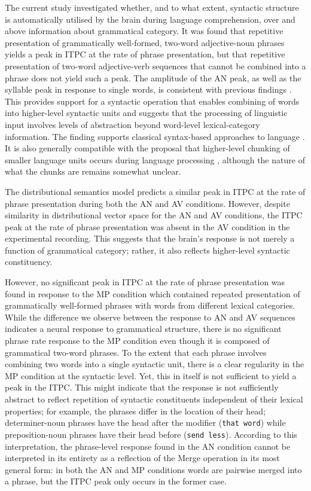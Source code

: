 \documentclass[10pt,letterpaper]{article}
\newcommand{\citet}[1]{\cite{#1}}
\begin{document}
The current study investigated whether, and to what extent, syntactic
structure is automatically utilised by the brain during language
comprehension, over and above information about grammatical
category. It was found that repetitive presentation of grammatically
well-formed, two-word adjective-noun phrases yields a peak in ITPC at
the rate of phrase presentation, but that repetitive presentation of
two-word adjective-verb sequences that cannot be combined into a
phrase does not yield such a peak. The amplitude of the AN peak, as well
as the syllable peak in response to single words, is consistent with
previous findings \citet{DingEtAl2017}. This provides support for a
syntactic operation that enables combining of words into higher-level
syntactic units and suggests that the processing of linguistic input
involves levels of abstraction beyond word-level lexical-category
information. The finding supports classical syntax-based approaches to
language \citet{BerwickEtAl2013,EveraertEtAl2015,Chomsky1995}. It is
also generally compatible with the proposal that higher-level chunking
of smaller language units occurs during language processing
\citet{ChristiansenChater2016}, although the nature of what the chunks
are remains somewhat unclear.

The distributional semantics model predicts a similar peak in ITPC at
the rate of phrase presentation during both the AN and AV
conditions. However, despite similarity in distributional vector space
for the AN and AV conditions, the ITPC peak at the rate of phrase
presentation was absent in the AV condition in the experimental
recording. This suggests that the brain's response is not merely a
function of grammatical category; rather, it also reflects
higher-level syntactic constituency.

However, no significant peak in ITPC at the rate of phrase
presentation was found in response to the MP condition which contained
repeated presentation of grammatically well-formed phrases with words
from different lexical categories. While the difference we observe
between the response to AN and AV sequences indicates a neural
response to grammatical structure, there is no significant phrase rate
response to the MP condition even though it is composed of grammatical
two-word phrases. To the extent that each phrase involves combining
two words into a single syntactic unit, there is a clear regularity in
the MP condition at the syntactic level. Yet, this in itself is not
sufficient to yield a peak in the ITPC. This might indicate that the
response is not sufficiently abstract to reflect repetition of
syntactic constituents independent of their lexical properties; for
example, the phrases differ in the location of their head;
determiner-noun phrases have the head after the modifier (\texttt{that
word}) while preposition-noun phrases have their head before (\texttt{send
less}). According to this interpretation, the phrase-level response
found in the AN condition cannot be interpreted in its entirety as a
reflection of the Merge operation \citet{Chomsky1995} in its most
general form: in both the AN and MP conditions words are pairwise
merged into a phrase, but the ITPC peak only occurs in the former
case.
\end{document}
